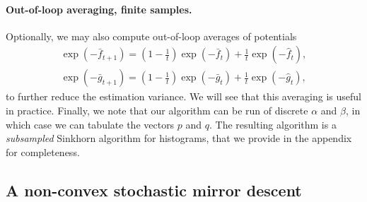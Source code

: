 \paragraph{Out-of-loop averaging, finite samples.} Optionally, we may also
compute out-of-loop averages of potentials
\begin{align}
    \exp(-\bar f_{t+1}) = (1 - \frac{1}{t}) \exp(-\bar f_t) + \frac{1}{t} \exp(-\hat f_t), \\
    \exp(-\bar g_{t+1}) = (1 - \frac{1}{t}) \exp(-\bar g_t) + \frac{1}{t} \exp(-\hat g_t),
\end{align}
to further reduce the estimation variance. We will see that this averaging is
useful in practice. Finally, we note that our algorithm can be run of discrete
$\alpha$ and $\beta$, in which case we can tabulate the vectors $p$ and $q$. The resulting
algorithm is a \textit{subsampled} Sinkhorn algorithm for histograms, that we provide in the
appendix for completeness.

\subsection{A non-convex stochastic mirror descent}


